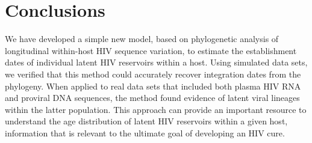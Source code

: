 \documentclass{bmcart}
\begin{document}

\section * {Conclusions} \label{sec:concl}
We have developed a simple new model, based on phylogenetic analysis of longitudinal within-host HIV sequence variation, to estimate the establishment dates of individual latent HIV reservoirs within a host.
Using simulated data sets, we verified that this method could accurately recover integration dates from the phylogeny.
When applied to real data sets that included both plasma HIV RNA and proviral DNA sequences, the method found evidence of latent viral lineages within the latter population.
This approach can provide an important resource to understand the age distribution of latent HIV reservoirs within a given host, information that is relevant to the ultimate goal of developing an HIV cure.
\end{document}
